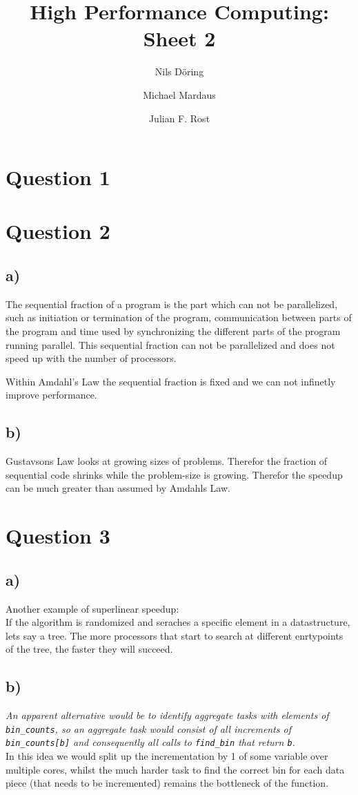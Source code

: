 \documentclass[10pt,a4paper]{scrartcl}
\author{Nils Döring \and Michael Mardaus \and Julian F. Rost}
\title{High Performance Computing: Sheet 2}
\begin{document}
\maketitle


\section{Question 1}


\section{Question 2}
\subsection{a)}
The sequential fraction of a program is the part which can not be parallelized, such as initiation or termination of the program, communication between parts of the program and time used by synchronizing the different parts of the program running parallel. This sequential fraction can not be parallelized and does not speed up with the number of processors.

Within Amdahl's Law the sequential fraction is fixed and we can not infinetly improve performance.

\subsection{b)}
Gustavsons Law looks at growing sizes of problems. Therefor the fraction of sequential code shrinks while the problem-size is growing. Therefor the speedup can be much greater than assumed by Amdahls Law.

\section{Question 3}

\subsection{a)}
Another example of superlinear speedup:\\
If the algorithm is randomized and seraches a specific element in a datastructure, lets say a tree. The more processors that start to search at different enrtypoints of the tree, the faster they will succeed.

\subsection{b)}
\textit{An apparent alternative would be to identify aggregate tasks with elements of \texttt{bin\_counts}, so an aggregate task would consist of all
increments of \texttt{bin\_counts[b]} and consequently all calls to \texttt{find\_bin} that return \texttt{b}.}\\

In this idea we would split up the incrementation by 1 of some variable over multiple cores, whilst the much harder task to find the correct bin for each data piece (that needs to be incremented) remains the bottleneck of the function.
\end{document}
